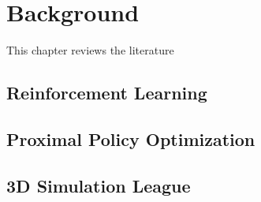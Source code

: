 \chapter{Background}
\label{cap:Background}



This chapter reviews the literature

\section{Reinforcement Learning}
\section{Proximal Policy Optimization}
\section{3D Simulation League}


